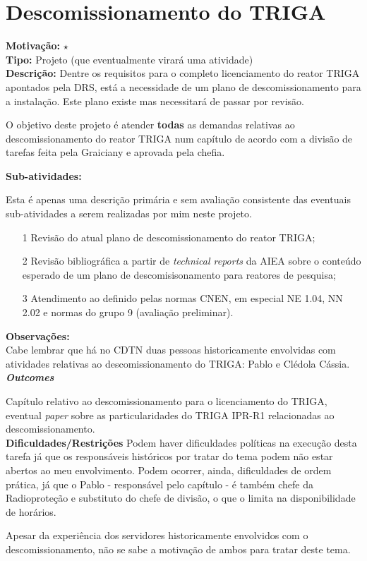 \chapter{Descomissionamento do TRIGA}

\textbf{Motivação:} $\star$\\

\textbf{Tipo:} Projeto (que eventualmente virará  uma atividade)\\

\textbf{Descrição:} Dentre os requisitos para o completo licenciamento do reator TRIGA apontados pela DRS, está a necessidade de um plano de descomissionamento para a instalação. Este plano existe mas necessitará de passar por revisão. 

O objetivo deste projeto é atender \textbf{todas} as demandas relativas ao descomissionamento do reator TRIGA num capítulo de acordo com a divisão de tarefas 
feita pela Graiciany e aprovada pela chefia.

\textbf{Sub-atividades:}

Esta é apenas uma descrição primária e sem avaliação consistente das eventuais 
sub-atividades a serem realizadas por mim neste projeto.

\begin{itemize}
	\item[1] Revisão do atual plano de descomissionamento do reator TRIGA;
	\item[2] Revisão bibliográfica a partir de \textit{technical reports} da AIEA 
	sobre o conteúdo esperado de um plano de descomisisonamento para reatores de pesquisa;
	\item[3] Atendimento ao definido pelas normas CNEN, em especial NE 1.04, NN 2.02 e normas do grupo 9 (avaliação preliminar).
\end{itemize}

\textbf{Observações:}\\

Cabe lembrar que há no CDTN duas pessoas historicamente envolvidas com atividades relativas ao descomissionamento do TRIGA: Pablo e Clédola Cássia.\\

\textbf{\textit{Outcomes}}

Capítulo relativo ao descomissionamento para o licenciamento do TRIGA, eventual 
\textit{paper} sobre as particularidades do TRIGA IPR-R1 relacionadas ao descomissionamento.\\

\textbf{Dificuldades/Restrições}
Podem haver dificuldades políticas na execução desta tarefa já que os responsáveis 
históricos por tratar do tema podem não estar abertos ao meu envolvimento. Podem ocorrer, ainda, dificuldades de ordem prática, já que o Pablo - responsável pelo capítulo - é também chefe da Radioproteção e substituto do chefe de divisão, o que 
o limita na disponibilidade de horários.

Apesar da experiência dos servidores historicamente envolvidos com o descomissionamento, não se sabe a motivação de ambos para tratar deste tema.


